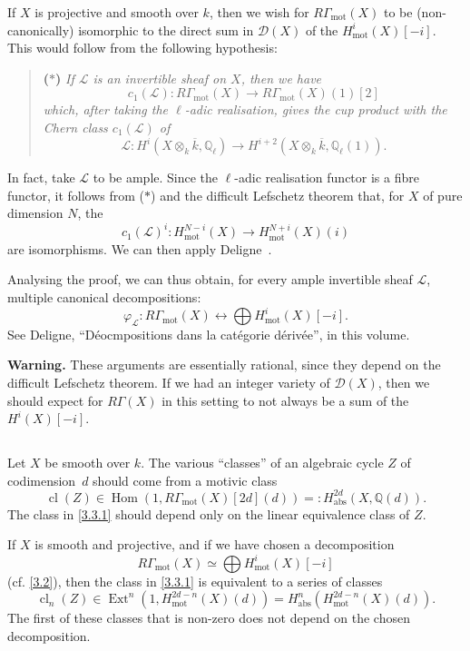 \documentclass{article}
\theoremstyle{plain}
\theoremstyle{definition}
\newcommand{\sh}{\mathscr}
\newcommand{\QQ}{\mathbb{Q}}
\newcommand{\mot}{\mathrm{mot}}
\newcommand{\abs}{\mathrm{abs}}
\DeclareMathOperator{\Hom}{Hom}
\DeclareMathOperator{\Ext}{Ext}
\DeclareMathOperator{\cl}{cl}
\newcommand{\oldpage}[1]{\marginpar{\footnotesize$\Big\vert$ \textit{p.~#1}}}
\begin{document}
If $X$ is projective and smooth over $k$, then we wish for $R\Gamma_\mot(X)$ to be (non-canonically) isomorphic to the direct sum in $\sh{D}(X)$ of the $H_\mot^i(X)[-i]$.
This would follow from the following hypothesis:
\begin{quote}
  \textbf{($*$)}
\itshape
  If $\sh{L}$ is an invertible sheaf on $X$, then we have
  \[c_1(\sh{L})\colon R\Gamma_\mot(X)\to R\Gamma_\mot(X)(1)[2]\]
  which, after taking the $\ell$-adic realisation, gives the cup product with the Chern class $c_1(\sh{L})$ of
  \[\sh{L}\colon H^i(X\otimes_k\overline{k},\QQ_\ell) \to H^{i+2}(X\otimes_k\overline{k},\QQ_\ell(1)).\]
\end{quote}

In fact, take $\sh{L}$ to be ample.
Since the $\ell$-adic realisation functor is a fibre functor, it follows from ($*$) and the difficult Lefschetz theorem that, for $X$ of pure dimension $N$, the
\[
  c_1(\sh{L})^i\colon H_\mot^{N-i}(X) \to H_\mot^{N+i}(X)(i)
\]
are isomorphisms.
We can then apply Deligne~\cite{8}.

\oldpage{156}
Analysing the proof, we can thus obtain, for every ample invertible sheaf $\sh{L}$, multiple canonical decompositions:
\[
  \varphi_\sh{L}\colon R\Gamma_\mot(X) \leftrightarrow \bigoplus H_\mot^i(X)[-i].
\]
See Deligne, ``D\'{e}ocmpositions dans la cat\'{e}gorie d\'{e}riv\'{e}e'', in this volume.

\bigskip

\textbf{Warning.}
These arguments are essentially rational, since they depend on the difficult Lefschetz theorem.
If we had an integer variety of $\sh{D}(X)$, then we should expect for $R\Gamma(X)$ in this setting to not always be a sum of the $H^i(X)[-i]$.


\subsection{}
\label{3.3}

Let $X$ be smooth over $k$.
The various ``classes'' of an algebraic cycle $Z$ of codimension~$d$ should come from a motivic class
\[
\label{3.3.1}
  \cl(Z) \in \Hom(1,R\Gamma_\mot(X)[2d](d)) =: H_\abs^{2d}(X,\QQ(d)).
\tag{3.3.1}
\]
The class in \cref{3.3.1} should depend only on the linear equivalence class of $Z$.

If $X$ is smooth and projective, and if we have chosen a decomposition
\[
  R\Gamma_\mot(X) \simeq \bigoplus H_\mot^i(X)[-i]
\]
(cf. \cref{3.2}), then the class in \cref{3.3.1} is equivalent to a series of classes
\[
\label{3.3.2}
  \cl_n(Z) \in \Ext^n(1,H_\mot^{2d-n}(X)(d)) = H_\abs^n(H_\mot^{2d-n}(X)(d)).
\tag{3.3.2}
\]
The first of these classes that is non-zero does not depend on the chosen decomposition.
\end{document}
